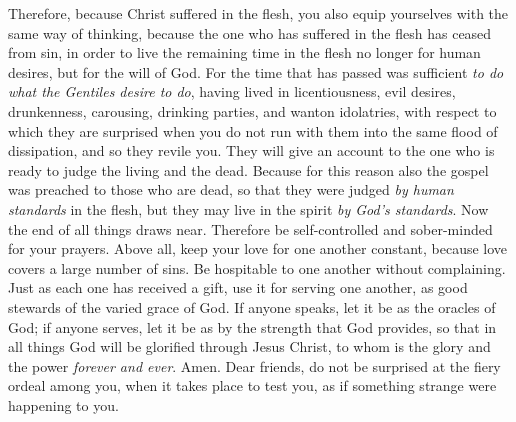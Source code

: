 \begin{biblechapter} %
 Therefore, because Christ suffered in the flesh, you also equip yourselves with the same way of thinking, because the one who has suffered in the flesh has ceased from sin,
\verse in order to live the remaining time in the flesh no longer for human desires, but for the will of God.
\verse For the time that has passed was sufficient \textit{to do what the Gentiles desire to do}, having lived in licentiousness, evil desires, drunkenness, carousing, drinking parties, and wanton idolatries,
\verse with respect to which they are surprised when you do not run with them into the same flood of dissipation, and so they revile you.
\verse They will give an account to the one who is ready to judge the living and the dead.
\verse Because for this reason also the gospel was preached to those who are dead, so that they were judged \textit{by human standards} in the flesh, but they may live in the spirit \textit{by God’s standards}.
 Now the end of all things draws near. Therefore be self-controlled and sober-minded for your prayers.
\verse Above all, keep your love for one another constant, because love covers a large number of sins.
\verse Be hospitable to one another without complaining.
\verse Just as each one has received a gift, use it for serving one another, as good stewards of the varied grace of God.
\verse If anyone speaks, let it be as the oracles of God; if anyone serves, let it be as by the strength that God provides, so that in all things God will be glorified through Jesus Christ, to whom is the glory and the power \textit{forever and ever}. Amen.
 Dear friends, do not be surprised at the fiery ordeal among you, when it takes place to test you, as if something strange were happening to you.

\end{biblechapter}
